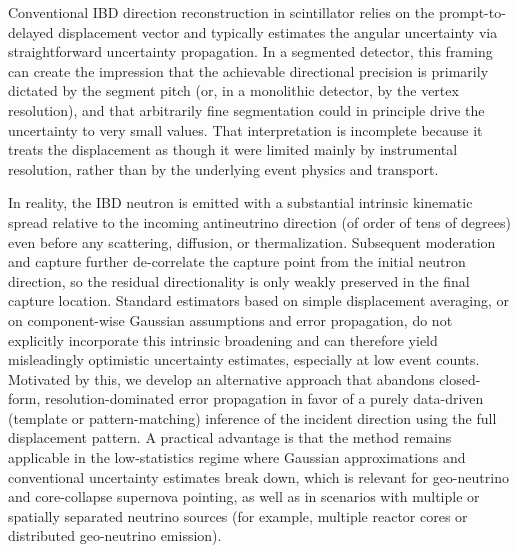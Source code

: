 \documentclass[tightenlines,
twocolumn,prl,notitlepage,nofootinbib,preprintnumbers,longbibliography]{revtex4-1}
\begin{document}
Conventional IBD direction reconstruction in scintillator relies on the prompt-to-delayed displacement vector and typically estimates the angular uncertainty via straightforward uncertainty propagation. In a segmented detector, this framing can create the impression that the achievable directional precision is primarily dictated by the segment pitch (or, in a monolithic detector, by the vertex resolution), and that arbitrarily fine segmentation could in principle drive the uncertainty to very small values. That interpretation is incomplete because it treats the displacement as though it were limited mainly by instrumental resolution, rather than by the underlying event physics and transport.

In reality, the IBD neutron is emitted with a substantial intrinsic kinematic spread relative to the incoming antineutrino direction (of order of tens of degrees) even before any scattering, diffusion, or thermalization. Subsequent moderation and capture further de-correlate the capture point from the initial neutron direction, so the residual directionality is only weakly preserved in the final capture location. Standard estimators based on simple displacement averaging, or on component-wise Gaussian assumptions and error propagation, do not explicitly incorporate this intrinsic broadening and can therefore yield misleadingly optimistic uncertainty estimates, especially at low event counts. Motivated by this, we develop an alternative approach that abandons closed-form, resolution-dominated error propagation in favor of a purely data-driven (template or pattern-matching) inference of the incident direction using the full displacement pattern. 
A practical advantage is that the method remains applicable in the low-statistics regime where Gaussian approximations and conventional uncertainty estimates break down, which is relevant for geo-neutrino and core-collapse supernova pointing, as well as in scenarios with multiple or spatially separated neutrino sources (for example, multiple reactor cores or distributed geo-neutrino emission).

\end{document}
